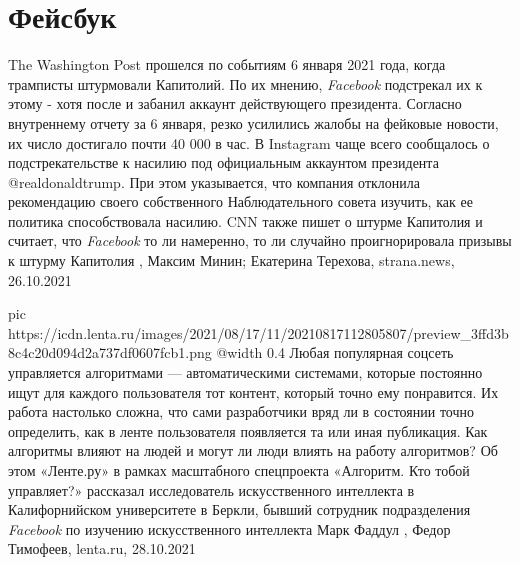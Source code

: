  
 
 
 
 
\chapter{Фейсбук}
\label{sec:slova.facebook}

The Washington Post прошелся по событиям 6 января 2021 года, когда трамписты
штурмовали Капитолий. По их мнению, \emph{Facebook} подстрекал их к этому -
хотя после и забанил аккаунт действующего президента.  Согласно внутреннему
отчету за 6 января, резко усилились жалобы на фейковые новости, их число
достигало почти 40 000 в час. В Instagram чаще всего сообщалось о
подстрекательстве к насилию под официальным аккаунтом президента
@realdonaldtrump.  При этом указывается, что компания отклонила рекомендацию
своего собственного Наблюдательного совета изучить, как ее политика
способствовала насилию.  CNN также пишет о штурме Капитолия и считает, что
\emph{Facebook} то ли намеренно, то ли случайно проигнорировала призывы к
штурму Капитолия
, 
Максим Минин; Екатерина Терехова, strana.news, 26.10.2021

\ifcmt
  pic https://icdn.lenta.ru/images/2021/08/17/11/20210817112805807/preview_3ffd3b8c4c20d094d2a737df0607fcb1.png
  @width 0.4
\fi
Любая популярная соцсеть управляется алгоритмами — автоматическими системами,
которые постоянно ищут для каждого пользователя тот контент, который точно ему
понравится. Их работа настолько сложна, что сами разработчики вряд ли в
состоянии точно определить, как в ленте пользователя появляется та или иная
публикация. Как алгоритмы влияют на людей и могут ли люди влиять на работу
алгоритмов? Об этом «Ленте.ру» в рамках масштабного спецпроекта «Алгоритм. Кто
тобой управляет?» рассказал исследователь искусственного интеллекта в
Калифорнийском университете в Беркли, бывший сотрудник подразделения \emph{Facebook}
по изучению искусственного интеллекта Марк Фаддул
, 
Федор Тимофеев, lenta.ru, 28.10.2021
